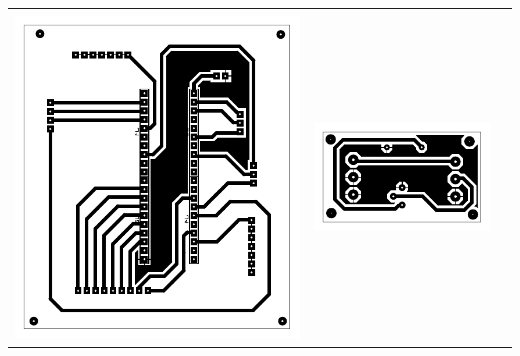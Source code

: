 \begin{tabular}{ccc} %
  \multicolumn{1}{c}{} & \multicolumn{1}{c}{} & \multicolumn{1}{c}{} \\ %
  \begin{minipage}{0.32\textwidth}
    \centering
    \includegraphics[width=\textwidth,height=0.2\textheight,keepaspectratio]{PCBS/LPC PCB.pdf} %
  \end{minipage} &
  \begin{minipage}{0.32\textwidth}
    \centering
    \includegraphics[width=\textwidth,height=0.2\textheight,keepaspectratio]{PCBS/Divisor de voltaje PCB.pdf} %

\end{minipage}
\end{tabular}
